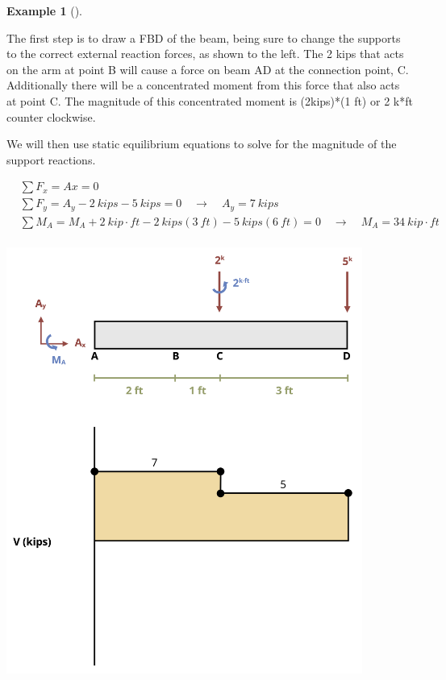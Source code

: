 \documentclass[
  letterpaper,
  DIV=11,
  numbers=noendperiod]{scrreprt}
\theoremstyle{definition}
\newtheorem{example}{Example}[chapter]
\theoremstyle{remark}
\begin{document}
\begin{tcolorbox}
\begin{example}[]
\begin{tcolorbox}
The first step is to draw a FBD of the beam, being sure to change the
supports to the correct external reaction forces, as shown to the left.
The 2 kips that acts on the arm at point B will cause a force on beam AD
at the connection point, C. Additionally there will be a concentrated
moment from this force that also acts at point C. The magnitude of this
concentrated moment is (2kips)*(1 ft) or 2 k*ft counter clockwise.

We will then use static equilibrium equations to solve for the magnitude
of the support reactions.

\[
\begin{aligned}
&\sum F_x=A x=0 \\
&\sum F_y=A_y-2{~kips}-5{~kips}=0 \quad\rightarrow\quad A_y=7{~kips} \\
&\sum M_A = M_A + 2{~kip\cdot ft} - 2{~kips}(3{~ft}) - 5{~kips}(6{~ft})=0 \quad\rightarrow\quad M_A=34{~kip\cdot ft} \\
\end{aligned}
\]

\begin{center}
\includegraphics[width=4.59375in,height=\textheight]{images/CH7 PNGs/example 7.4 part 3.png}
\end{center}


\end{tcolorbox}
\end{example}
\end{tcolorbox}
\end{document}
